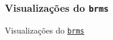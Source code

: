 \subsubsection{Visualizações do \texttt{brms}}
\begin{frame}{Visualizações do \href{https://paul-buerkner.github.io/brms/}{\texttt{brms}}}
\begin{columns}
    \begin{column}{0.5\textwidth}
        \centering
        \begin{figure}
            \resizebox{0.9\linewidth}{!}{}
        \end{figure}
    \end{column}
    \begin{column}{0.5\textwidth}
        \centering
        \begin{figure}
            \resizebox{0.9\linewidth}{!}{}
        \end{figure}
    \end{column}
\end{columns}
\end{frame}

